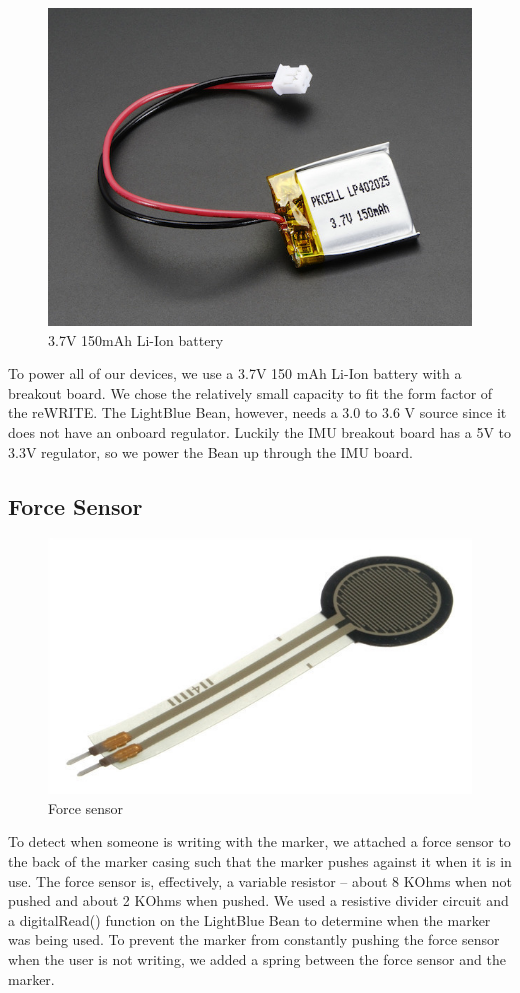 \documentclass[12pt,journal]{IEEEtran}
\begin{document}
\begin{figure}[H]
  \centering
    \includegraphics[width=0.6\linewidth]{figures/battery}
  \caption{3.7V 150mAh Li-Ion battery}
  \label{fig:battery}
\end{figure}

	To power all of our devices, we use a 3.7V 150 mAh Li-Ion battery with a breakout board. We chose the relatively small capacity to fit the form factor of the reWRITE. The LightBlue Bean, however, needs a 3.0 to 3.6 V source since it does not have an onboard regulator. Luckily the IMU breakout board has a 5V to 3.3V regulator, so we power the Bean up through the IMU board.

\subsection{Force Sensor}

\begin{figure}[H]
  \centering
    \includegraphics[width=0.6\linewidth]{figures/force-sensor}
  \caption{Force sensor}
  \label{fig:system}
\end{figure}

	To detect when someone is writing with the marker, we attached a force sensor to the back of the marker casing such that the marker pushes against it when it is in use. The force sensor is, effectively, a variable resistor -- about 8 KOhms when not pushed and about 2 KOhms when pushed. We used a resistive divider circuit and a digitalRead() function on the LightBlue Bean to determine when the marker was being used. To prevent the marker from constantly pushing the force sensor when the user is not writing, we added a spring between the force sensor and the marker.
\end{document}
